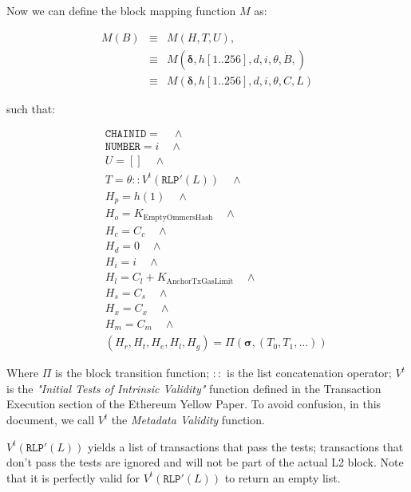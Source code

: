 \documentclass[9pt,oneside]{amsart}
\begin{document}
\begin{multicols}{2}
Now we can define the block mapping function $M$ as:

\begin{eqnarray}
M(B) & \equiv & M(H, T, U), \\
\nonumber & \equiv &  M(\boldsymbol{\delta}, h[1..256], {d}, i, \theta, \dot{B}, )  \\
\nonumber & \equiv & M(\boldsymbol{\delta}, h[1..256], {d}, i, \theta, C, L)
\end{eqnarray}

such that:

\begin{eqnarray}
& & \texttt{CHAINID}  = \quad \wedge \\
\nonumber& & \texttt{NUMBER} = {i} \quad \wedge \\
\nonumber& & U = [] \quad \wedge \\
\nonumber& & T =  \theta::V^t(\texttt{RLP}'(L)) \quad \wedge  \\
\nonumber& & H_p =  h(1) \quad \wedge \\
\nonumber& & H_o =   K_{\mathrm{EmptyOmmersHash}} \quad \wedge \\
\nonumber& & H_c =   C_c \quad \wedge \\
\nonumber& & H_d =   0 \quad \wedge \\
\nonumber& & H_i =   i \quad \wedge \\
\nonumber& & H_l =   C_l + K_{\mathrm{AnchorTxGasLimit}} \quad \wedge \\
\nonumber& & H_s =   C_s \quad \wedge \\
\nonumber& & H_x =   C_x \quad \wedge \\
\nonumber& & H_m =   C_m \quad \wedge \\
\nonumber& & (H_r, H_t, H_e, H_l, H_g) =   \Pi(\boldsymbol{\sigma}, (T_0, T_1, ...))
\end{eqnarray}

Where $\Pi$ is the block transition function; $::$ is the list concatenation operator; $V^t$ is the \emph{"Initial Tests of Intrinsic Validity"} function defined in the Transaction Execution section of the Ethereum Yellow Paper. To avoid confusion, in this document, we call $V^t$ the \emph{Metadata Validity} function.

$V^t(\texttt{RLP}'(L))$ yields a list of transactions that pass the tests; transactions that don't pass the tests are ignored and will not be part of the actual L2 block. Note that it is perfectly valid for $V^t(\texttt{RLP}'(L))$ to return an empty list.


\end{multicols}
\end{document}
